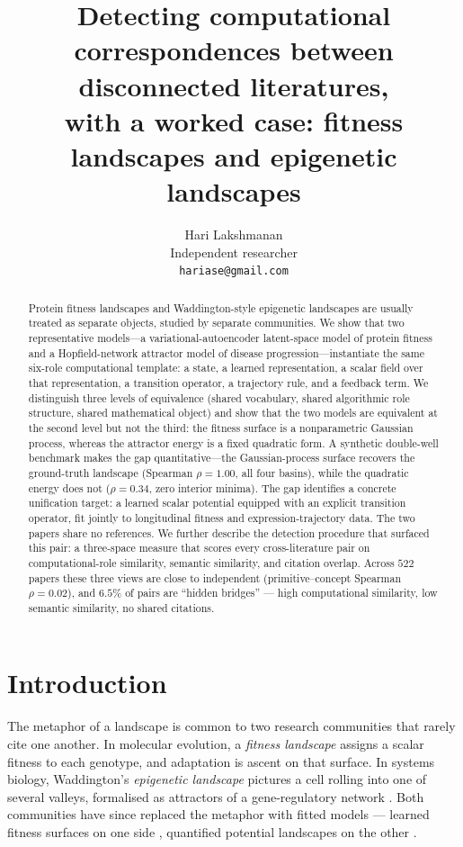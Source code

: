 \documentclass[11pt]{article}
\title{\bfseries Detecting computational correspondences between disconnected literatures,\\
\large with a worked case: fitness landscapes and epigenetic landscapes}
\author{Hari Lakshmanan\\ \small Independent researcher \\ \small\texttt{hariase@gmail.com}}
\date{}
\begin{document}
\maketitle
\vspace{-2.2em}
\begin{abstract}
Protein fitness landscapes and Waddington-style epigenetic landscapes are usually treated as separate objects, studied by separate communities. We show that two representative models---a variational-autoencoder latent-space model of protein fitness and a Hopfield-network attractor model of disease progression---instantiate the same six-role computational template: a state, a learned representation, a scalar field over that representation, a transition operator, a trajectory rule, and a feedback term. We distinguish three levels of equivalence (shared vocabulary, shared algorithmic role structure, shared mathematical object) and show that the two models are equivalent at the second level but not the third: the fitness surface is a nonparametric Gaussian process, whereas the attractor energy is a fixed quadratic form. A synthetic double-well benchmark makes the gap quantitative---the Gaussian-process surface recovers the ground-truth landscape (Spearman $\rho=1.00$, all four basins), while the quadratic energy does not ($\rho=0.34$, zero interior minima). The gap identifies a concrete unification target: a learned scalar potential equipped with an explicit transition operator, fit jointly to longitudinal fitness and expression-trajectory data. The two papers share no references. We further describe the detection procedure that surfaced this pair: a three-space measure that
scores every cross-literature pair on computational-role similarity, semantic similarity, and citation overlap.
Across $522$ papers these three views are close to independent (primitive--concept Spearman $\rho=0.02$), and
$6.5\%$ of pairs are ``hidden bridges'' --- high computational similarity, low semantic similarity, no shared
citations.
\end{abstract}

\section{Introduction}
The metaphor of a landscape is common to two research communities that rarely cite one another. In molecular
evolution, a \emph{fitness landscape} assigns a scalar fitness to each genotype, and adaptation is ascent on that
surface. In systems biology, Waddington's \emph{epigenetic landscape} \citep{waddington1957strategy} pictures a cell
rolling into one of several valleys, formalised as attractors of a gene-regulatory network
\citep{huang2005cellfates}. Both communities have since replaced the metaphor with fitted models --- learned fitness
surfaces on one side \citep{riesselman2018deepseq,rives2021esm}, quantified potential landscapes on the other
\citep{wang2011waddington,huang2009cancer}.
\end{document}

